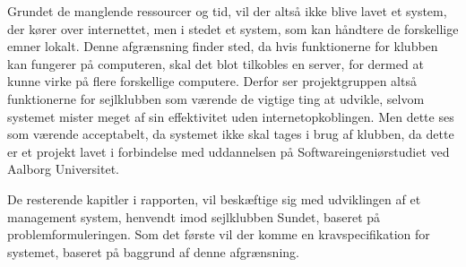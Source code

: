 Grundet de manglende ressourcer og tid, vil der altså ikke blive lavet et system, der kører over internettet,
men i stedet et system, som kan håndtere de forskellige emner lokalt. 
Denne afgrænsning finder sted, da hvis funktionerne for klubben kan fungerer på computeren, skal det blot tilkobles en server, for dermed at kunne
virke på flere forskellige computere.
Derfor ser projektgruppen altså funktionerne for sejlklubben som værende de vigtige ting at udvikle, selvom systemet mister meget af sin effektivitet uden internetopkoblingen. 
Men dette ses som værende acceptabelt, da systemet ikke skal tages i brug af klubben, da dette er et projekt lavet i forbindelse med uddannelsen på Softwareingeniørstudiet ved Aalborg Universitet.

De resterende kapitler i rapporten, vil beskæftige sig med udviklingen af et management system, henvendt imod
sejlklubben Sundet, baseret på problemformuleringen. Som det første vil der komme en kravspecifikation for
systemet, baseret på baggrund af denne afgrænsning.
